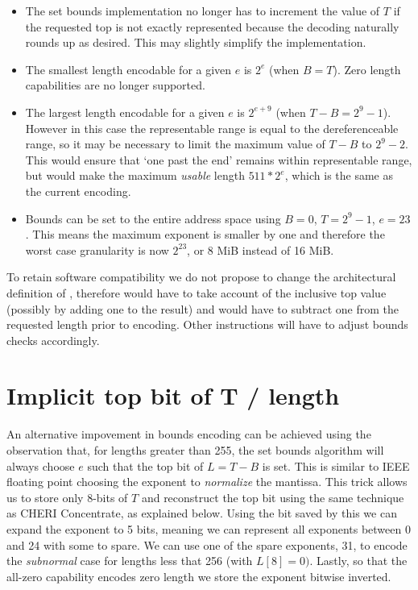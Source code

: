 \begin{itemize}
    \item The set bounds implementation no longer has to increment the value of $T$ if the requested top is not exactly represented because the decoding naturally rounds up as desired. 
    This may slightly simplify the implementation.
    \item The smallest length encodable for a given $e$ is $2^e$ (when $B=T$). Zero length capabilities are no longer supported.
    \item The largest length encodable for a given $e$ is $2^{e+9}$ (when $T-B=2^9-1$).
    However in this case the representable range is equal to the dereferenceable range, so it may be necessary to limit the maximum value of $T-B$ to $2^9 - 2$.
    This would ensure that `one past the end' remains within representable range, but would make the maximum \emph{usable} length $511 * 2^e$, which is the same as the current encoding.
    \item Bounds can be set to the entire address space using $B=0$, $T=2^9-1$, $e=23$. 
    This means the maximum exponent is smaller by one and therefore the worst case granularity is now $2^{23}$, or 8 MiB instead of 16 MiB.
\end{itemize}
To retain software compatibility we do not propose to change the architectural definition of \ctop{}, therefore  would have to take account of the inclusive top value (possibly by adding one to the result) and  would have to subtract one from the requested length prior to encoding.
Other instructions will have to adjust bounds checks accordingly.

\section{Implicit top bit of T / length}

An alternative impovement in bounds encoding can be achieved using the observation that, for lengths greater than 255, the set bounds algorithm will always choose $e$ such that the top bit of $L=T-B$ is set.
This is similar to IEEE floating point choosing the exponent to \emph{normalize} the mantissa.
This trick allows us to store only 8-bits of $T$ and reconstruct the top bit using the same technique as CHERI Concentrate\cite{Woodruff2019}, as explained below.
Using the bit saved by this we can expand the exponent to 5 bits, meaning we can represent all exponents between 0 and 24 with some to spare.
We can use one of the spare exponents, 31, to encode the \emph{subnormal} case for lengths less that 256 (with $L[8] = 0)$.
Lastly, so that the all-zero capability encodes zero length we store the exponent bitwise inverted.

